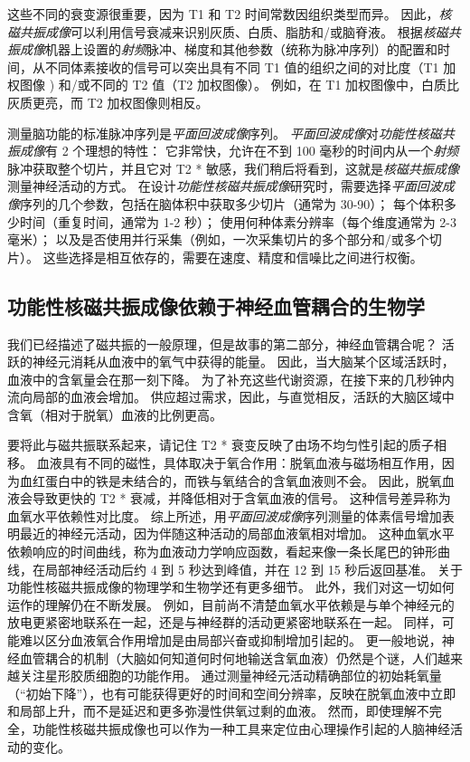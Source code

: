 这些不同的衰变源很重要，因为 T1 和 T2 时间常数因组织类型而异。 
因此，\textit{核磁共振成像}可以利用信号衰减来识别灰质、白质、脂肪和/或脑脊液。 
根据\textit{核磁共振成像}机器上设置的\textit{射频}脉冲、梯度和其他参数（统称为脉冲序列）的配置和时间，从不同体素接收的信号可以突出具有不同 T1 值的组织之间的对比度（T1 加权图像 ) 和/或不同的 T2 值（T2 加权图像）。 
例如，在 T1 加权图像中，白质比灰质更亮，而 T2 加权图像则相反。


测量脑功能的标准脉冲序列是\textit{平面回波成像}序列。 
\textit{平面回波成像}对\textit{功能性核磁共振成像}有 2 个理想的特性：
它非常快，允许在不到 100 毫秒的时间内从一个\textit{射频}脉冲获取整个切片，并且它对 T2 * 敏感，我们稍后将看到，这就是\textit{核磁共振成像}测量神经活动的方式。
在设计\textit{功能性核磁共振成像}研究时，需要选择\textit{平面回波成像}序列的几个参数，包括在脑体积中获取多少切片（通常为 30-90）；
每个体积多少时间（重复时间，通常为 1-2 秒）；
使用何种体素分辨率（每个维度通常为 2-3 毫米）； 
以及是否使用并行采集（例如，一次采集切片的多个部分和/或多个切片）。
这些选择是相互依存的，需要在速度、精度和信噪比之间进行权衡。



\subsection{功能性核磁共振成像依赖于神经血管耦合的生物学}

我们已经描述了磁共振的一般原理，但是故事的第二部分，神经血管耦合呢？
活跃的神经元消耗从血液中的氧气中获得的能量。 
因此，当大脑某个区域活跃时，血液中的含氧量会在那一刻下降。
为了补充这些代谢资源，在接下来的几秒钟内流向局部的血液会增加。
供应超过需求，因此，与直觉相反，活跃的大脑区域中含氧（相对于脱氧）血液的比例更高。


要将此与磁共振联系起来，请记住 T2 * 衰变反映了由场不均匀性引起的质子相移。 
血液具有不同的磁性，具体取决于氧合作用：脱氧血液与磁场相互作用，因为血红蛋白中的铁是未结合的，而铁与氧结合的含氧血液则不会。
因此，脱氧血液会导致更快的 T2 * 衰减，并降低相对于含氧血液的信号。
这种信号差异称为血氧水平依赖性对比度。 
综上所述，用\textit{平面回波成像}序列测量的体素信号增加表明最近的神经元活动，因为伴随这种活动的局部血液氧相对增加。
这种血氧水平依赖响应的时间曲线，称为血液动力学响应函数，看起来像一条长尾巴的钟形曲线，在局部神经活动后约 4 到 5 秒达到峰值，并在 12 到 15 秒后返回基准。
关于功能性核磁共振成像的物理学和生物学还有更多细节。 
此外，我们对这一切如何运作的理解仍在不断发展。 
例如，目前尚不清楚血氧水平依赖是与单个神经元的放电更紧密地联系在一起，还是与神经群的活动更紧密地联系在一起。
同样，可能难以区分血液氧合作用增加是由局部兴奋或抑制增加引起的。 
更一般地说，神经血管耦合的机制（大脑如何知道何时何地输送含氧血液）仍然是个谜，人们越来越关注星形胶质细胞的功能作用。 
通过测量神经元活动精确部位的初始耗氧量（“初始下降”），也有可能获得更好的时间和空间分辨率，反映在脱氧血液中立即和局部上升，而不是延迟和更多弥漫性供氧过剩的血液。 
然而，即使理解不完全，功能性核磁共振成像也可以作为一种工具来定位由心理操作引起的人脑神经活动的变化。



